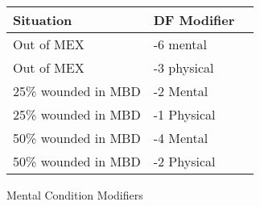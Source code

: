\begin{SHTable}[h]
	\begin{tabular}{lll}
	Situation			& DF Modifier	\\
	\hline
	Out of MEX 			& -6 mental 	\\
	Out of MEX			& -3 physical	\\
	25\% wounded in MBD & -2 Mental		\\
	25\% wounded in MBD	& -1 Physical 	\\
	50\% wounded in MBD & -4 Mental		\\
	50\% wounded in MBD & -2 Physical	\\

    \end{tabular}
    \caption{Mental Condition Modifiers}
\end{SHTable}
